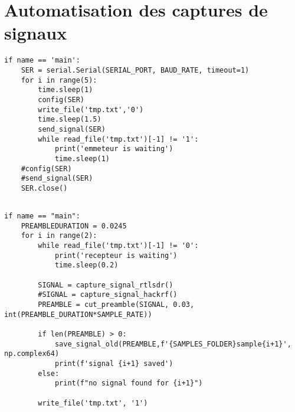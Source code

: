 \newpage

\section{Automatisation des captures de signaux}\label{codeauto}


\begin{lstlisting}[style=pythonstyle, caption={Emetteur}, label={lst:python}]
if name == 'main':
    SER = serial.Serial(SERIAL_PORT, BAUD_RATE, timeout=1)
    for i in range(5):
        time.sleep(1)
        config(SER)
        write_file('tmp.txt','0')
        time.sleep(1.5)
        send_signal(SER)
        while read_file('tmp.txt')[-1] != '1':
            print('emmeteur is waiting')
            time.sleep(1)
    #config(SER)
    #send_signal(SER)
    SER.close()
\end{lstlisting}

\begin{lstlisting}[style=pythonstyle, caption={Récepteur}, label={lst:python}]

if name == "main":
    PREAMBLEDURATION = 0.0245
    for i in range(2):
        while read_file('tmp.txt')[-1] != '0':
            print('recepteur is waiting')
            time.sleep(0.2)

        SIGNAL = capture_signal_rtlsdr()
        #SIGNAL = capture_signal_hackrf()
        PREAMBLE = cut_preamble(SIGNAL, 0.03, int(PREAMBLE_DURATION*SAMPLE_RATE))

        if len(PREAMBLE) > 0:
            save_signal_old(PREAMBLE,f'{SAMPLES_FOLDER}sample{i+1}', np.complex64)
            print(f'signal {i+1} saved')
        else:
            print(f"no signal found for {i+1}")

        write_file('tmp.txt', '1')
\end{lstlisting}

